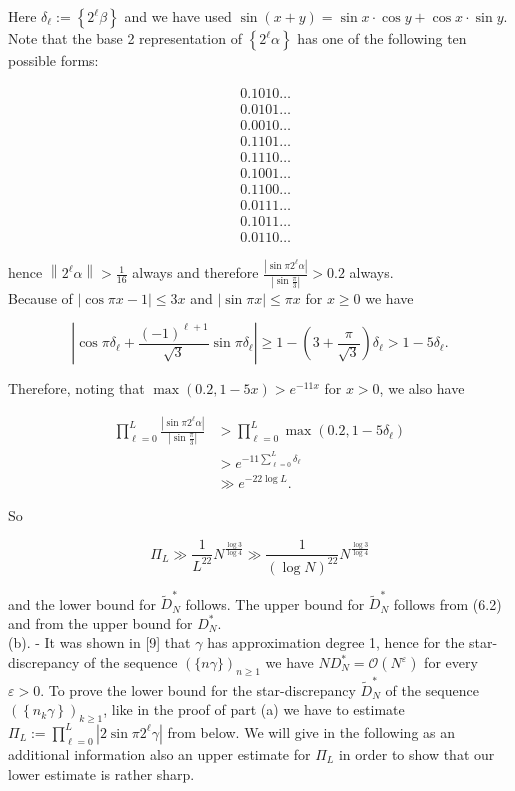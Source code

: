 \documentclass[10pt]{article}
\newcommand{\1}{\mathbf{1}}
\begin{document}
Here $\delta_{\ell}:=\left\{2^{\ell} \beta\right\}$ and we have used $\sin (x+y)=\sin x \cdot \cos y+\cos x \cdot \sin y$. Note that the base 2 representation of $\left\{2^{\ell} \alpha\right\}$ has one of the following ten possible forms:

$$
\begin{aligned}
& 0.1010 \ldots \\
& 0.0101 \ldots \\
& 0.0010 \ldots \\
& 0.1101 \ldots \\
& 0.1110 \ldots \\
& 0.1001 \ldots \\
& 0.1100 \ldots \\
& 0.0111 \ldots \\
& 0.1011 \ldots \\
& 0.0110 \ldots
\end{aligned}
$$

hence $\left\|2^{\ell} \alpha\right\|>\frac{1}{16}$ always and therefore $\frac{\left|\sin \pi 2^{\ell} \alpha\right|}{\left|\sin \frac{\pi}{3}\right|}>0.2$ always.\\
Because of $|\cos \pi x-1| \leqslant 3 x$ and $|\sin \pi x| \leqslant \pi x$ for $x \geqslant 0$ we have

$$
\left|\cos \pi \delta_{\ell}+\frac{(-1)^{\ell+1}}{\sqrt{3}} \sin \pi \delta_{\ell}\right| \geqslant 1-\left(3+\frac{\pi}{\sqrt{3}}\right) \delta_{\ell}>1-5 \delta_{\ell} .
$$

Therefore, noting that $\max (0.2,1-5 x)>e^{-11 x}$ for $x>0$, we also have

$$
\begin{aligned}
\prod_{\ell=0}^{L} \frac{\left|\sin \pi 2^{\ell} \alpha\right|}{\left|\sin \frac{\pi}{3}\right|} & >\prod_{\ell=0}^{L} \max \left(0.2,1-5 \delta_{\ell}\right) \\
& >e^{-11 \sum_{\ell=0}^{L} \delta_{\ell}} \\
& \gg e^{-22 \log L} .
\end{aligned}
$$

So

$$
\Pi_{L} \gg \frac{1}{L^{22}} N^{\frac{\log 3}{\log 4}} \gg \frac{1}{(\log N)^{22}} N^{\frac{\log 3}{\log 4}}
$$

and the lower bound for $\widetilde{D}_{N}^{*}$ follows. The upper bound for $\widetilde{D}_{N}^{*}$ follows from (6.2) and from the upper bound for $D_{N}^{*}$.\\[0pt]
(b). - It was shown in [9] that $\gamma$ has approximation degree 1, hence for the star-discrepancy of the sequence $(\{n\gamma\})_{n\geqslant1}$ we have $N D_{N}^{*}=\mathcal{O}\left(N^{\varepsilon}\right)$ for every $\varepsilon>0$. To prove the lower bound for the star-discrepancy $\widetilde{D}_{N}^{*}$ of the sequence $\left(\left\{n_{k} \gamma\right\}\right)_{k \geqslant 1}$, like in the proof of part (a) we have to estimate $\Pi_{L}:=\prod_{\ell=0}^{L}\left|2 \sin \pi 2^{\ell} \gamma\right|$ from below. We will give in the following as an additional information also an upper estimate for $\Pi_{L}$ in order to show that our lower estimate is rather sharp.
\end{document}
